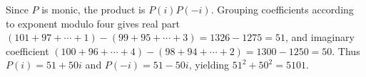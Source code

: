 Since $P$ is monic, the product is $P(i)P(-i)$. Grouping coefficients according to exponent modulo four gives real part $(101+97+\cdots+1)-(99+95+\cdots+3)=1326-1275=51$, and imaginary coefficient $(100+96+\cdots+4)-(98+94+\cdots+2)=1300-1250=50$. Thus $P(i)=51+50i$ and $P(-i)=51-50i$, yielding $51^2+50^2=\boxed{5101}$.

